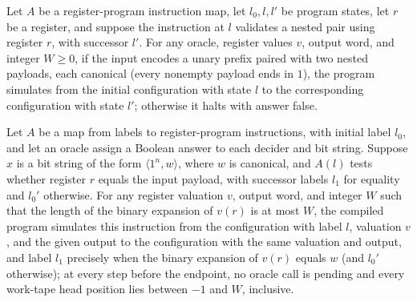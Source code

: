\begin{lemma}
\label{Complexity.LogProg.sim_valQ}
\leanok
{}
Let $A$ be a register-program instruction map, let $l_0,l,l'$ be program states, let $r$
be a register, and suppose the instruction at $l$ validates a nested pair using register
$r$, with successor $l'$. For any oracle, register values $v$, output word, and integer
$W\ge 0$, if the input encodes a unary prefix paired with two nested payloads, each
canonical (every nonempty payload ends in $1$), the program simulates from the initial
configuration with state $l$ to the corresponding configuration with state $l'$;
otherwise it halts with answer false.
\end{lemma}

\begin{lemma}
\label{Complexity.LogProg.sim_jeqIn}
\leanok
{}
Let $A$ be a map from labels to register-program instructions, with initial label $l_0$,
and let an oracle assign a Boolean answer to each decider and bit string. Suppose $x$ is
a bit string of the form $\langle 1^n,w\rangle$, where $w$ is canonical, and $A(l)$
tests whether register $r$ equals the input payload, with successor labels $l_1$ for
equality and $l_0'$ otherwise. For any register valuation $v$, output word, and integer
$W$ such that the length of the binary expansion of $v(r)$ is at most $W$, the compiled
program simulates this instruction from the configuration with label $l$, valuation $v$,
and the given output to the configuration with the same valuation and output, and label
$l_1$ precisely when the binary expansion of $v(r)$ equals $w$ (and $l_0'$ otherwise);
at every step before the endpoint, no oracle call is pending and every work-tape head
position lies between $-1$ and $W$, inclusive.
\end{lemma}

